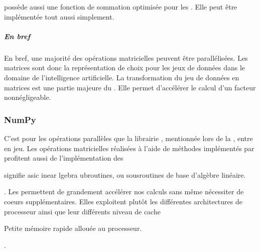 \documentclass[letterpaper,10pt,french]{sphinxmanual}
\begin{document}
 possède aussi une fonction de sommation optimisée pour les . Elle peut être implémentée tout aussi simplement.

\begin{sphinxVerbatim}[commandchars=\\\{\}]
   
  \PYG{p}{[}\PYG{p}{]}
  
\end{sphinxVerbatim}


\subparagraph{En bref}
\label{\detokenize{preprocessing:en-bref}}
En bref, une majorité des opérations matricielles peuvent être parallélisées. Les matrices sont donc la représentation de choix pour les jeux de données dans le domaine de l’intelligence artificielle. La transformation du jeu de données en matrices est une partie majeure du . Elle permet d’accélérer le calcul d’un facteur non\sphinxhyphen{}négligeable.


\subsubsection{NumPy}
\label{\detokenize{preprocessing:numpy}}
C’est pour les opérations parallèles que la librairie , mentionnée lors de la {\hyperref[\detokenize{explications_librairies::doc}]{}}, entre en jeu. Les opérations matricielles réalisées à l’aide de méthodes implémentés par profitent aussi de l’implémentation des %
\begin{footnote}[30]\sphinxAtStartFootnote
{} signifie asic inear lgebra ubroutines, ou sous\sphinxhyphen{}routines de base d’algèbre linéaire.
%
\end{footnote}. Les  permettent de grandement accélérer nos calculs sans même nécessiter de coeurs supplémentaires. Elles exploitent plutôt les différentes architectures de processeur ainsi que leur différents niveau de cache%
\begin{footnote}[31]\sphinxAtStartFootnote
Petite mémoire rapide allouée au processeur.
%
\end{footnote}.
\end{document}
